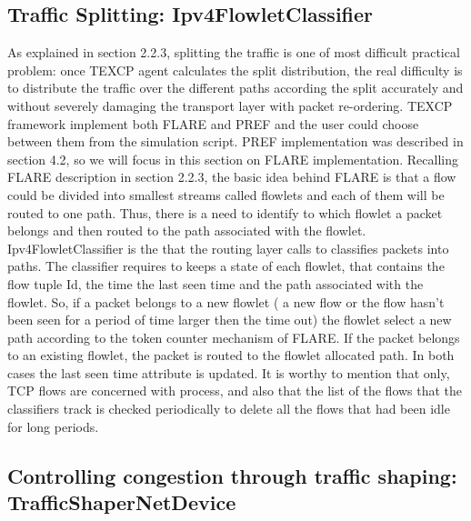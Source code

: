 \subsection{Traffic Splitting: Ipv4FlowletClassifier}

As explained in section 2.2.3, splitting the traffic is one of most difficult practical problem: once TEXCP agent calculates the split distribution, the real difficulty is to distribute the traffic over the different paths according the split accurately and without  severely damaging the transport layer with packet re-ordering. TEXCP framework implement both FLARE and PREF and the user could choose between them from the simulation script. PREF implementation was described in section 4.2, so we will focus in this section on FLARE implementation. Recalling FLARE description in section 2.2.3, the basic idea behind FLARE is that a flow could be divided into smallest streams called flowlets and each of them will be routed to one path. Thus, there is a need to identify to which flowlet a packet belongs and then routed to the path associated with the flowlet. Ipv4FlowletClassifier is the that the routing layer calls to classifies packets into paths. The classifier requires to keeps a state of each flowlet, that contains the flow tuple Id, the time the last seen time and the path associated with the flowlet. So, if a packet belongs to a new flowlet ( a new flow or the flow hasn't been seen for a period of time larger then the time out) the flowlet select a new path according to the token counter mechanism of FLARE. If the packet belongs to an existing flowlet, the packet is routed to the flowlet allocated path. In both cases the last seen time attribute is updated. It is worthy to mention that only, TCP flows are concerned with process, and also that the list of the flows that the classifiers track is checked periodically to delete all the flows that had been idle for long periods. 

\subsection{Controlling congestion through traffic shaping: TrafficShaperNetDevice}

